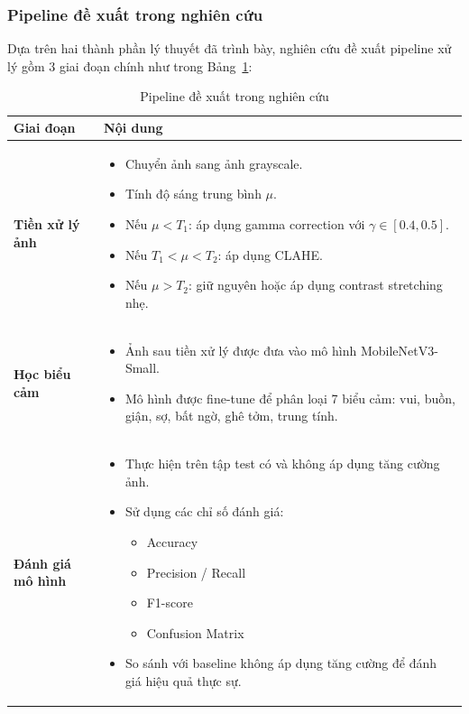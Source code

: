 \subsubsection{Pipeline đề xuất trong nghiên cứu}

Dựa trên hai thành phần lý thuyết đã trình bày, nghiên cứu đề xuất pipeline xử lý gồm 3 giai đoạn chính như trong Bảng~\ref{tab:pipeline}:

\begin{table}[H]
\centering
\caption{Pipeline đề xuất trong nghiên cứu}
\label{tab:pipeline}
\begin{tabular}{|p{4cm}|p{10cm}|}
\hline
\textbf{Giai đoạn} & \textbf{Nội dung} \\
\hline
\textbf{Tiền xử lý ảnh} &
\begin{itemize}[leftmargin=*]
    \item Chuyển ảnh sang ảnh grayscale.
    \item Tính độ sáng trung bình $\mu$.
    \item Nếu $\mu < T_1$: áp dụng gamma correction với $\gamma \in [0.4, 0.5]$.
    \item Nếu $T_1 < \mu < T_2$: áp dụng CLAHE.
    \item Nếu $\mu > T_2$: giữ nguyên hoặc áp dụng contrast stretching nhẹ.
\end{itemize} \\
\hline
\textbf{Học biểu cảm} &
\begin{itemize}[leftmargin=*]
    \item Ảnh sau tiền xử lý được đưa vào mô hình MobileNetV3-Small.
    \item Mô hình được fine-tune để phân loại 7 biểu cảm: vui, buồn, giận, sợ, bất ngờ, ghê tởm, trung tính.
\end{itemize} \\
\hline
\textbf{Đánh giá mô hình} &
\begin{itemize}[leftmargin=*]
    \item Thực hiện trên tập test có và không áp dụng tăng cường ảnh.
    \item Sử dụng các chỉ số đánh giá:
    \begin{itemize}
        \item Accuracy
        \item Precision / Recall
        \item F1-score
        \item Confusion Matrix
    \end{itemize}
    \item So sánh với baseline không áp dụng tăng cường để đánh giá hiệu quả thực sự.
\end{itemize} \\
\hline
\end{tabular}
\end{table}

